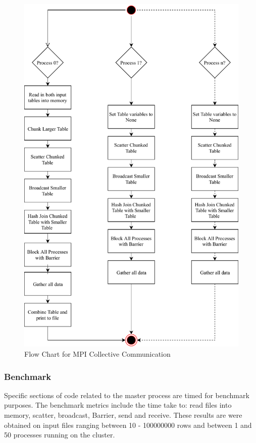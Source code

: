 \documentclass[10.5 pt, conference]{IEEEtran}
\begin{document}
\begin{figure}[h!]
\centering
\includegraphics[width=\columnwidth]{FlowChar.pdf}
\centering
\caption{Flow Chart for MPI Collective Communication}
\label{flow}
\end{figure}

\subsubsection{Benchmark} 
Specific sections of code related to the master process are timed for benchmark purposes. The benchmark metrics include the time take to: read files into memory, scatter, broadcast, Barrier, send and receive. These results are were obtained on input files ranging between \num{10} - \num{100000000} rows and between \num{1} and \num{50} processes running on the cluster.
\end{document}
